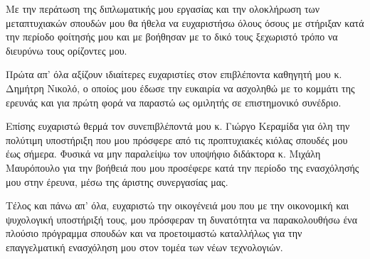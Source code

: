 \begin{acknowledgements}
    Με την περάτωση της διπλωματικής μου εργασίας και την ολοκλήρωση των μεταπτυχιακών σπουδών μου θα ήθελα να ευχαριστήσω όλους όσους με στήριξαν κατά την περίοδο φοίτησής μου και με βοήθησαν με το δικό τους ξεχωριστό τρόπο να διευρύνω τους ορίζοντες μου.
    
    Πρώτα απ' όλα αξίζουν ιδιαίτερες ευχαριστίες στον επιβλέποντα καθηγητή μου κ. Δημήτρη Νικολό, ο οποίος μου έδωσε την ευκαιρία να ασχοληθώ με το κομμάτι της ερευνάς και για πρώτη φορά να παραστώ ως ομιλητής σε επιστημονικό συνέδριο.
    
    Επίσης ευχαριστώ θερμά τον συνεπιβλέποντά μου κ. Γιώργο Κεραμίδα για όλη την πολύτιμη υποστήριξη που μου πρόσφερε από τις προπτυχιακές κιόλας σπουδές μου έως σήμερα. Φυσικά να μην παραλείψω τον υποψήφιο διδάκτορα κ. Μιχάλη Μαυρόπουλο για την βοήθειά που μου προσέφερε κατά την περίοδο της ενασχόλησής μου στην έρευνα, μέσω της άριστης συνεργασίας μας.
    
    Τέλος και πάνω απ' όλα, ευχαριστώ την οικογένειά μου που με την οικονομική και ψυχολογική υποστήριξή τους, μου πρόσφεραν τη δυνατότητα να παρακολουθήσω ένα πλούσιο πρόγραμμα σπουδών και να προετοιμαστώ καταλλήλως για την επαγγελματική ενασχόληση μου στον τομέα των νέων τεχνολογιών.
\end{acknowledgements}

